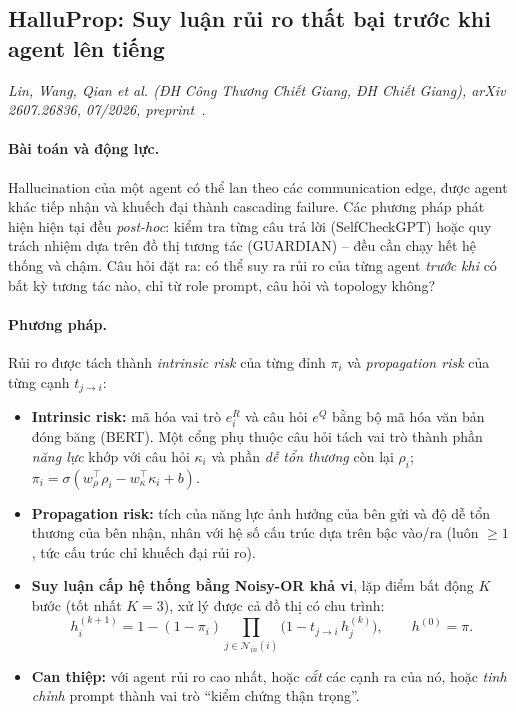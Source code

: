 \subsection{HalluProp: Suy luận rủi ro thất bại trước khi agent lên tiếng}
\label{sec:halluprop}

\noindent\textit{Lin, Wang, Qian et al. (ĐH Công Thương Chiết Giang, ĐH Chiết Giang), arXiv 2607.26836, 07/2026, preprint~\cite{p5halluprop}.}

\paragraph{Bài toán và động lực.} Hallucination của một agent có thể lan theo các communication edge, được agent khác tiếp nhận và khuếch đại thành cascading failure. Các phương pháp phát hiện hiện tại đều \emph{post-hoc}: kiểm tra từng câu trả lời (SelfCheckGPT) hoặc quy trách nhiệm dựa trên đồ thị tương tác (GUARDIAN) -- đều cần chạy hết hệ thống và chậm. Câu hỏi đặt ra: có thể suy ra rủi ro của từng agent \emph{trước khi} có bất kỳ tương tác nào, chỉ từ role prompt, câu hỏi và topology không?

\paragraph{Phương pháp.} Rủi ro được tách thành \emph{intrinsic risk} của từng đỉnh $\pi_i$ và \emph{propagation risk} của từng cạnh $t_{j\to i}$:
\begin{itemize}
  \item \textbf{Intrinsic risk:} mã hóa vai trò $e^R_i$ và câu hỏi $e^Q$ bằng bộ mã hóa văn bản đóng băng (BERT). Một cổng phụ thuộc câu hỏi tách vai trò thành phần \emph{năng lực} khớp với câu hỏi $\kappa_i$ và phần \emph{dễ tổn thương} còn lại $\rho_i$; $\pi_i = \sigma(w_\rho^\top\rho_i - w_\kappa^\top\kappa_i + b)$.
  \item \textbf{Propagation risk:} tích của năng lực ảnh hưởng của bên gửi và độ dễ tổn thương của bên nhận, nhân với hệ số cấu trúc dựa trên bậc vào/ra (luôn $\ge 1$, tức cấu trúc chỉ khuếch đại rủi ro).
  \item \textbf{Suy luận cấp hệ thống bằng Noisy-OR khả vi}, lặp điểm bất động $K$ bước (tốt nhất $K=3$), xử lý được cả đồ thị có chu trình:
  \begin{equation}
    h_i^{(k+1)} = 1 - (1-\pi_i)\prod_{j\in\mathcal N_{in}(i)}\big(1 - t_{j\to i}\, h_j^{(k)}\big),\qquad h^{(0)} = \pi.
  \end{equation}
  \item \textbf{Can thiệp:} với agent rủi ro cao nhất, hoặc \emph{cắt} các cạnh ra của nó, hoặc \emph{tinh chỉnh} prompt thành vai trò ``kiểm chứng thận trọng''.
\end{itemize}

